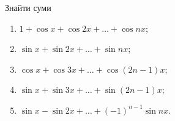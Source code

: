 ﻿%






\setcounter{section}{1}

\setcounter{problem}{61}
\begin{problem}
	Знайти суми
	\begin{enumerate}
		\item $1 + \cos x + \cos 2x + \ldots + \cos nx$;
		\item $\sin x + \sin 2x + \ldots + \sin nx$;
		\item $\cos x + \cos 3x + \ldots + \cos (2n - 1) x$;
		\item $\sin x + \sin 3x + \ldots + \sin (2n - 1) x$;
		\item $\sin x - \sin 2x + \ldots + (-1)^{n-1} \sin nx$.
	\end{enumerate}
\end{problem}
